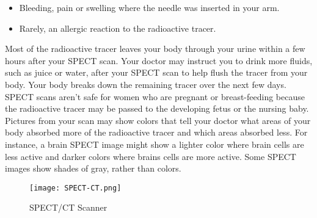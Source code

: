 \documentclass[12pt]{article}
\begin{document}
 \begin{itemize}
\item Bleeding, pain or swelling where the needle was inserted in your arm.
\item Rarely, an allergic reaction to the radioactive tracer.
\end{itemize}
Most of the radioactive tracer leaves your body through your urine within a few hours after your SPECT scan. Your doctor may instruct you to drink more fluids, such as juice or water, after your SPECT scan to help flush the tracer from your body. Your body breaks down the remaining tracer over the next few days.\newline
SPECT scans aren't safe for women who are pregnant or breast-feeding because the radioactive tracer may be passed to the developing fetus or the nursing baby.\newline \\
 Pictures from your scan may show colors that tell your doctor what areas of your body absorbed more of the radioactive tracer and which areas absorbed less. For instance, a brain SPECT image might show a lighter color where brain cells are less active and darker colors where brains cells are more active. Some SPECT images show shades of gray, rather than colors.\newline \\
 \begin{figure}
     \centering
     \texttt{[image: SPECT-CT.png]}
     \caption{SPECT/CT Scanner}
 \end{figure}
 \newpage
\end{document}
